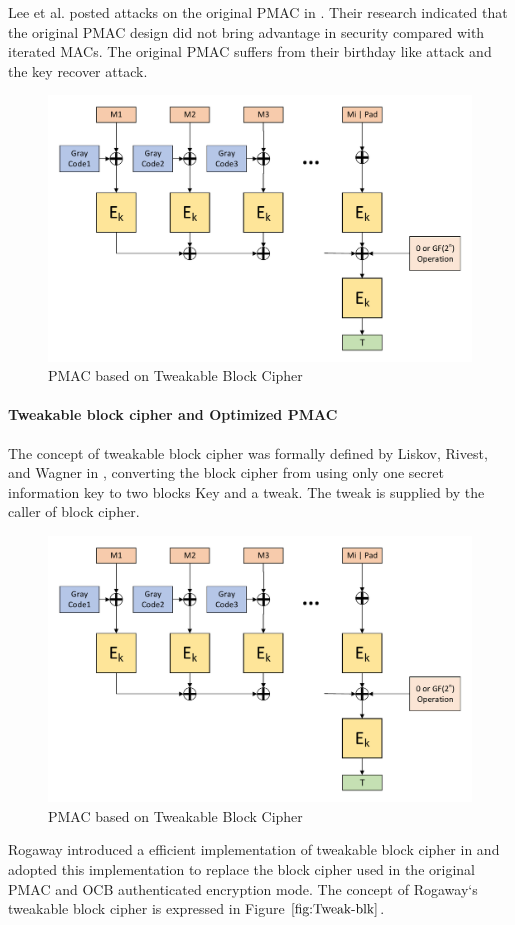 \documentclass{article}
\begin{document}
Lee et al. posted attacks on the original PMAC in \cite{pmac_forgery}. Their research indicated that the original PMAC design did not bring advantage in security compared with iterated MACs. The original PMAC suffers from their birthday like attack and the key recover attack.

\begin{figure}[htbp]
\centering
\includegraphics[scale=0.5]{./diagrams/PMAC.pdf}
\caption{PMAC based on Tweakable Block Cipher}
\label{fig:Tweak-PMAC}
\end{figure}
\paragraph{Tweakable block cipher and Optimized PMAC}
The concept of tweakable block cipher was formally defined by Liskov, Rivest, and Wagner in \cite{tweak}, converting the block cipher from using only one secret information key to two blocks Key and a tweak. The tweak is supplied by the caller of block cipher. 
\begin{figure}[htbp]
\centering
\includegraphics[scale=0.5]{./diagrams/PMAC.pdf}
\caption{PMAC based on Tweakable Block Cipher}
\label{fig:Tweak-blk}
\end{figure}
Rogaway introduced a efficient implementation of tweakable block cipher in \cite{tweak_pmac}and adopted this implementation to replace the block cipher used in the original PMAC and OCB authenticated encryption mode. The concept of Rogaway`s tweakable block cipher is expressed in Figure $\ref{fig:Tweak-blk}$.
\end{document}
